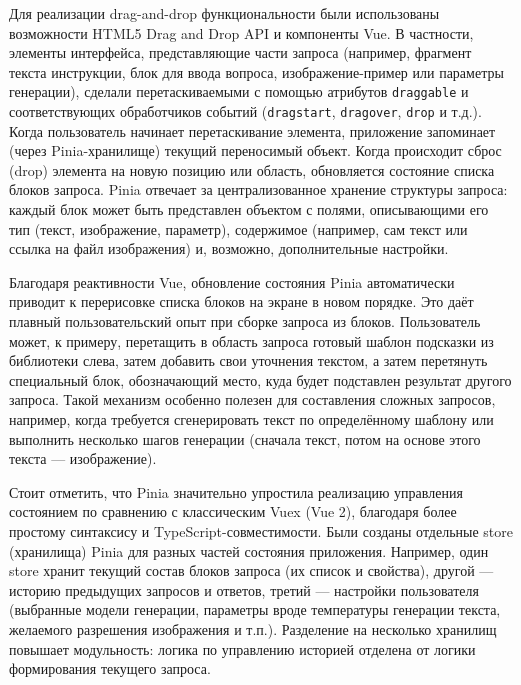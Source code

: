 Для реализации drag-and-drop функциональности были использованы возможности HTML5 Drag and Drop API и компоненты Vue. В частности, элементы интерфейса, представляющие части запроса (например, фрагмент текста инструкции, блок для ввода вопроса, изображение-пример или параметры генерации), сделали перетаскиваемыми с помощью атрибутов \verb|draggable| и соответствующих обработчиков событий (\verb|dragstart|, \verb|dragover|, \verb|drop| и т.д.). Когда пользователь начинает перетаскивание элемента, приложение запоминает (через Pinia-хранилище) текущий переносимый объект. Когда происходит сброс (drop) элемента на новую позицию или область, обновляется состояние списка блоков запроса. Pinia отвечает за централизованное хранение структуры запроса: каждый блок может быть представлен объектом с полями, описывающими его тип (текст, изображение, параметр), содержимое (например, сам текст или ссылка на файл изображения) и, возможно, дополнительные настройки.

Благодаря реактивности Vue, обновление состояния Pinia автоматически приводит к перерисовке списка блоков на экране в новом порядке. Это даёт плавный пользовательский опыт при сборке запроса из блоков. Пользователь может, к примеру, перетащить в область запроса готовый шаблон подсказки\cite{copilotworks:promptgen} из библиотеки слева, затем добавить свои уточнения текстом, а затем перетянуть специальный блок, обозначающий место, куда будет подставлен результат другого запроса. Такой механизм особенно полезен для составления сложных запросов, например, когда требуется сгенерировать текст по определённому шаблону или выполнить несколько шагов генерации (сначала текст, потом на основе этого текста — изображение).

Стоит отметить, что Pinia значительно упростила реализацию управления состоянием по сравнению с классическим Vuex (Vue 2), благодаря более простому синтаксису и TypeScript-совместимости. Были созданы отдельные store (хранилища) Pinia для разных частей состояния приложения. Например, один store хранит текущий состав блоков запроса (их список и свойства), другой — историю предыдущих запросов и ответов, третий — настройки пользователя (выбранные модели генерации, параметры вроде температуры генерации текста, желаемого разрешения изображения и т.п.). Разделение на несколько хранилищ повышает модульность: логика по управлению историей отделена от логики формирования текущего запроса.

